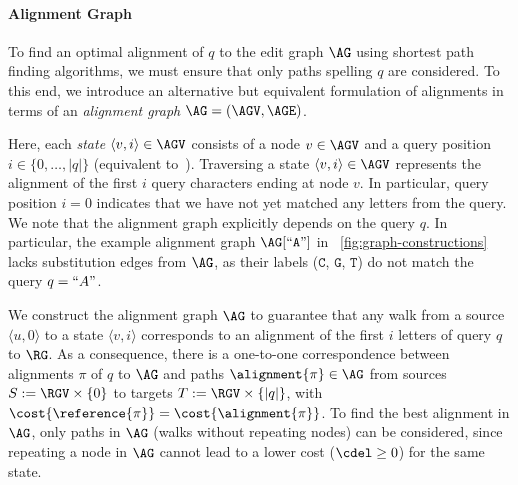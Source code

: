 
\paragraph{Alignment Graph}
To find an optimal alignment of $q$ to the edit graph $\AG$ using shortest path
finding algorithms, we must ensure that only paths spelling $q$ are considered.
To this end, we introduce an alternative but equivalent formulation of
alignments in terms of an \emph{alignment graph} $\AG=(\AGV,\AGE)$.

Here, each \emph{state} $\langle v,i \rangle \in \AGV$ consists of a node $v \in
\AGV$ and a query position $i \in \{0,\dots,|q|\}$ (equivalent
to~\cite{rautiainen_aligning_2017}). Traversing a state $\langle v,i \rangle \in
\AGV$ represents the alignment of the first $i$ query characters ending at node $v$.
%
In particular, query position $i=0$ indicates that we have not yet matched any
letters from the query.
%
We note that the alignment graph explicitly depends on the query $q$. In
particular, the example alignment graph $\AG[``\texttt{A}"]$ in
~\cref{fig:graph-constructions} lacks substitution edges from $\AG$, as their
labels ($\texttt{C}$, $\texttt{G}$, $\texttt{T}$) do not match the query
$q=``A"$.

We construct the alignment graph $\AG$ to guarantee that any walk from a source
$\langle u,0 \rangle$ to a state $\langle v,i \rangle$ corresponds to an
alignment of the first $i$ letters of query $q$ to $\RG$. As a consequence,
there is a one-to-one correspondence between alignments $\pi$ of $q$ to
$\AG$ and paths $\alignment{\pi} \in \AG$ from sources $S:=\RGV \times \{0\}$ to
targets $T:=\RGV \times \{|q|\}$, with
$\cost{\reference{\pi}}=\cost{\alignment{\pi}}$. To find the best alignment in
$\AG$, only paths in $\AG$ (walks without repeating nodes) can be considered,
since repeating a node in $\AG$ cannot lead to a lower cost ($\cdel \geq 0$) for
the same state.

